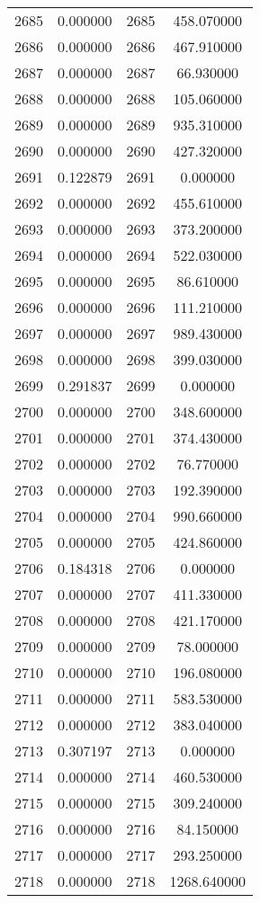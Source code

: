 \documentclass[12pt]{article}
\begin{document}
\begin{longtable}{@{}cccc@{}}
2685 & 0.000000 & 2685 & 458.070000 \\
2686 & 0.000000 & 2686 & 467.910000 \\
2687 & 0.000000 & 2687 & 66.930000 \\
2688 & 0.000000 & 2688 & 105.060000 \\
2689 & 0.000000 & 2689 & 935.310000 \\
2690 & 0.000000 & 2690 & 427.320000 \\
2691 & 0.122879 & 2691 & 0.000000 \\
2692 & 0.000000 & 2692 & 455.610000 \\
2693 & 0.000000 & 2693 & 373.200000 \\
2694 & 0.000000 & 2694 & 522.030000 \\
2695 & 0.000000 & 2695 & 86.610000 \\
2696 & 0.000000 & 2696 & 111.210000 \\
2697 & 0.000000 & 2697 & 989.430000 \\
2698 & 0.000000 & 2698 & 399.030000 \\
2699 & 0.291837 & 2699 & 0.000000 \\
2700 & 0.000000 & 2700 & 348.600000 \\
2701 & 0.000000 & 2701 & 374.430000 \\
2702 & 0.000000 & 2702 & 76.770000 \\
2703 & 0.000000 & 2703 & 192.390000 \\
2704 & 0.000000 & 2704 & 990.660000 \\
2705 & 0.000000 & 2705 & 424.860000 \\
2706 & 0.184318 & 2706 & 0.000000 \\
2707 & 0.000000 & 2707 & 411.330000 \\
2708 & 0.000000 & 2708 & 421.170000 \\
2709 & 0.000000 & 2709 & 78.000000 \\
2710 & 0.000000 & 2710 & 196.080000 \\
2711 & 0.000000 & 2711 & 583.530000 \\
2712 & 0.000000 & 2712 & 383.040000 \\
2713 & 0.307197 & 2713 & 0.000000 \\
2714 & 0.000000 & 2714 & 460.530000 \\
2715 & 0.000000 & 2715 & 309.240000 \\
2716 & 0.000000 & 2716 & 84.150000 \\
2717 & 0.000000 & 2717 & 293.250000 \\
2718 & 0.000000 & 2718 & 1268.640000 \\

\end{longtable}
\end{document}
